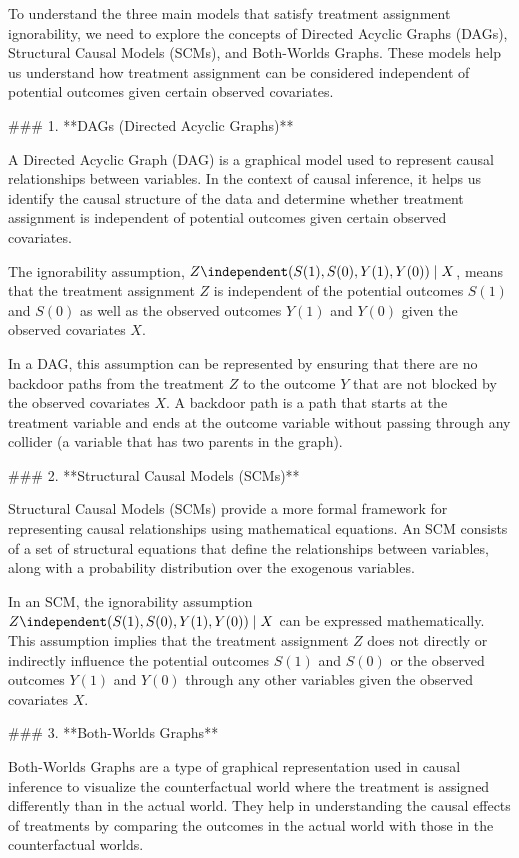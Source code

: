 To understand the three main models that satisfy treatment assignment ignorability, we need to explore the concepts of Directed Acyclic Graphs (DAGs), Structural Causal Models (SCMs), and Both-Worlds Graphs. These models help us understand how treatment assignment can be considered independent of potential outcomes given certain observed covariates.

### 1. **DAGs (Directed Acyclic Graphs)**

A Directed Acyclic Graph (DAG) is a graphical model used to represent causal relationships between variables. In the context of causal inference, it helps us identify the causal structure of the data and determine whether treatment assignment is independent of potential outcomes given certain observed covariates.

The ignorability assumption, \( Z \independent (S(1), S(0), Y(1), Y(0)) \mid X \), means that the treatment assignment \( Z \) is independent of the potential outcomes \( S(1) \) and \( S(0) \) as well as the observed outcomes \( Y(1) \) and \( Y(0) \) given the observed covariates \( X \).

In a DAG, this assumption can be represented by ensuring that there are no backdoor paths from the treatment \( Z \) to the outcome \( Y \) that are not blocked by the observed covariates \( X \). A backdoor path is a path that starts at the treatment variable and ends at the outcome variable without passing through any collider (a variable that has two parents in the graph).

### 2. **Structural Causal Models (SCMs)**

Structural Causal Models (SCMs) provide a more formal framework for representing causal relationships using mathematical equations. An SCM consists of a set of structural equations that define the relationships between variables, along with a probability distribution over the exogenous variables.

In an SCM, the ignorability assumption \( Z \independent (S(1), S(0), Y(1), Y(0)) \mid X \) can be expressed mathematically. This assumption implies that the treatment assignment \( Z \) does not directly or indirectly influence the potential outcomes \( S(1) \) and \( S(0) \) or the observed outcomes \( Y(1) \) and \( Y(0) \) through any other variables given the observed covariates \( X \).

### 3. **Both-Worlds Graphs**

Both-Worlds Graphs are a type of graphical representation used in causal inference to visualize the counterfactual world where the treatment is assigned differently than in the actual world. They help in understanding the causal effects of treatments by comparing the outcomes in the actual world with those in the counterfactual worlds.

